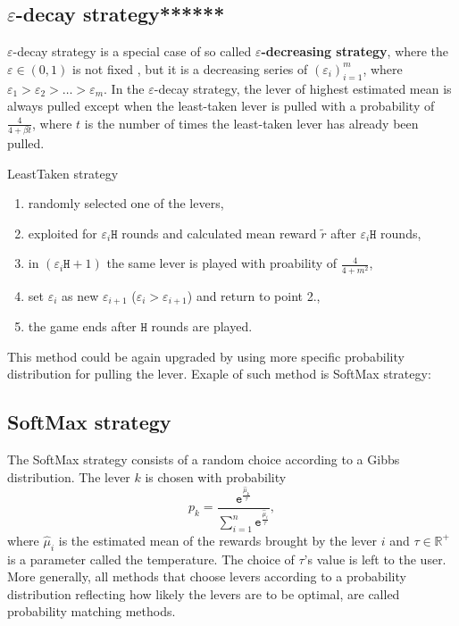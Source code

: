 \documentclass[11pt,american,czech]{article}
\newcommand{\e}{\mathtt{e}} %
\newcommand{\R}{\mathbb{R}} %
\begin{document}
	\subsection*{$\varepsilon$-decay strategy******}
	$\varepsilon$-decay strategy is a special case of so called \textbf{$\varepsilon$-decreasing strategy}, where the $\varepsilon\in(0,1)$ is not fixed , but it is a decreasing series of $(\varepsilon_i)_{i=1}^m$, where $\varepsilon_1>\varepsilon_2>\dots>\varepsilon_m$. In the $\varepsilon$-decay strategy, the lever of highest estimated mean is always pulled except when the least-taken lever is pulled with a probability of $\frac{4}{4+\beta t}$, where $t$ is the number of times the least-taken lever has already been pulled.
	\begin{tcolorbox}[colframe=white]
		LeastTaken strategy
		\begin{enumerate}
			\item randomly selected one of the levers,
			\item exploited for $\varepsilon_i\mathtt{H}$ rounds and calculated mean reward $\tilde{r}$ after $\varepsilon_i\mathtt{H}$ rounds,
			\item in $(\varepsilon_i\mathtt{H}+1)$ the same lever is played with proability of $\frac{4}{4+m^2}$, 
			\item set $\varepsilon_i$ as new $\varepsilon_{i+1}$ ($\varepsilon_i>\varepsilon_{i+1}$) and return to point 2.,
			\item the game ends after $\mathtt{H}$ rounds are played.
		\end{enumerate}
	\end{tcolorbox}
	This method could be again upgraded by using more specific probability distribution for pulling the lever. Exaple of such method is SoftMax strategy: 
	\subsection*{SoftMax strategy}
	The SoftMax strategy consists of a random choice according to a Gibbs distribution. The lever $k$ is chosen with probability 
	$$p_k =\frac{\e^{\frac{\hat{\mu}_k}{\tau}}}{\sum_{i=1}^{n}\e^{\frac{\hat{\mu}_i}{\tau}}},$$
	where $\hat{\mu}_i$ is the estimated mean of the rewards brought by the lever $i$ and $\tau\in\R^+$ is a parameter called the temperature. The choice of $\tau$’s value is left to the user. More generally, all methods that choose levers according to a probability distribution reflecting how likely the levers are to be optimal, are called probability matching methods.
\end{document}
